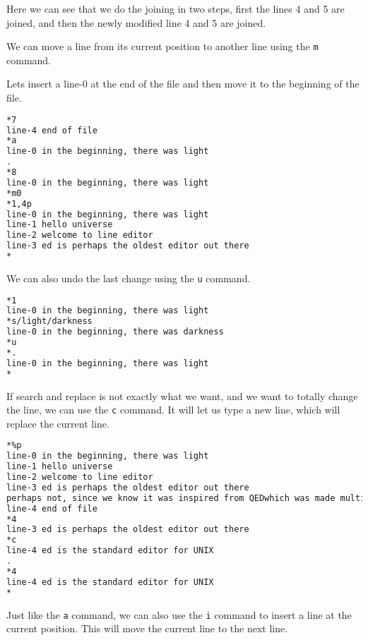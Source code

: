 Here we can see that we do the joining in two steps,
first the lines 4 and 5 are joined,
and then the newly modified line 4 and 5 are joined.

We can move a line from its current position to another
line using the \lstinline|m| command.

Lets insert a line-0 at the end of the file
and then move it to the beginning of the file.

\begin{lstlisting}[language=bash]
*7
line-4 end of file
*a
line-0 in the beginning, there was light
.
*8
line-0 in the beginning, there was light
*m0
*1,4p
line-0 in the beginning, there was light
line-1 hello universe
line-2 welcome to line editor
line-3 ed is perhaps the oldest editor out there
*
\end{lstlisting}

We can also undo the last change using the \lstinline|u| command.

\begin{lstlisting}[language=bash]
*1
line-0 in the beginning, there was light
*s/light/darkness
line-0 in the beginning, there was darkness
*u
*.
line-0 in the beginning, there was light
*
\end{lstlisting}

If search and replace is not exactly what we want, and
we want to totally change the line, we can use the \lstinline|c| command.
It will let us type a new line, which will replace the current line.

\begin{lstlisting}[language=bash]
*%p
line-0 in the beginning, there was light
line-1 hello universe
line-2 welcome to line editor
line-3 ed is perhaps the oldest editor out there
perhaps not, since we know it was inspired from QEDwhich was made multiple times by thompson and ritchiebefore ed was made.
line-4 end of file
*4
line-3 ed is perhaps the oldest editor out there
*c
line-4 ed is the standard editor for UNIX
.
*4
line-4 ed is the standard editor for UNIX
*
\end{lstlisting}

Just like the \lstinline|a| command, we can also use the \lstinline|i| command
to insert a line at the current position. This will move the current line
to the next line.

